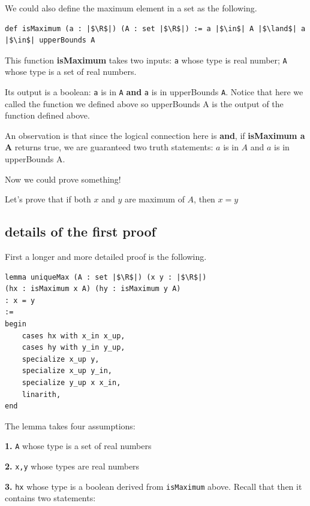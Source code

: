 \documentclass[a4paper]{article}
\newcommand{\R}{\mathbb{R}}
\theoremstyle{bfnote} %
\theoremstyle{bfnote}                  %
\theoremstyle{example}                       %
\theoremstyle{remark}                       %
\numberwithin{equation}{section}
\begin{document}
We could also define the maximum element in a set as the following.

\begin{listing}[!ht]
\begin{verbatim}
def isMaximum (a : |$\R$|) (A : set |$\R$|) := a |$\in$| A |$\land$| a |$\in$| upperBounds A
\end{verbatim}
\end{listing}

This function \textbf{isMaximum} takes two inputs: \texttt{a} whose type is real number; \texttt{A} whose type is a set of real numbers.

Its output is a boolean: \texttt{a} is in \texttt{A}  \textbf{and} \texttt{a} is in upperBounds \texttt{A}. Notice that here we called the function we defined above so upperBounds A is the output of the function defined above.

An observation is that since the logical connection here is \textbf{and}, if \textbf{isMaximum a A} returns true, we are guaranteed two truth statements: $a$ is in  $A$ and  $a$ is in upperBounds A.  

\bigskip

Now we could prove something! 

Let's prove that if both  $x$ and  $y$ are maximum of  $A$, then  $x = y$

\subsection{details of the first proof}
First a longer and more detailed proof is the following.

\begin{verbatim}
lemma uniqueMax (A : set |$\R$|) (x y : |$\R$|) 
(hx : isMaximum x A) (hy : isMaximum y A) 
: x = y 
:= 
begin
	cases hx with x_in x_up,
	cases hy with y_in y_up,
	specialize x_up y,
	specialize x_up y_in,
	specialize y_up x x_in,
	linarith,
end

\end{verbatim}	


The lemma takes four assumptions: 

\textbf{1. }\texttt{A} whose type is a set of real numbers

\textbf{2. }\texttt{x,y} whose types are real numbers

\textbf{3. }\texttt{hx} whose type is a boolean derived from \texttt{isMaximum} above. Recall that then it contains two statements: 
\end{document}
